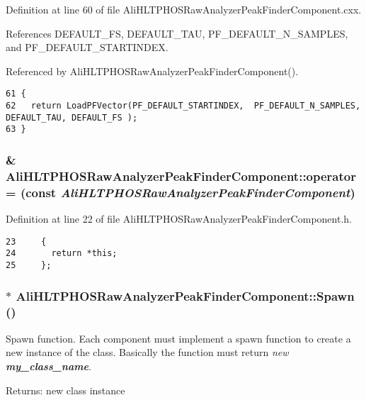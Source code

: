 Definition at line 60 of file Ali\-HLTPHOSRaw\-Analyzer\-Peak\-Finder\-Component.cxx.

References DEFAULT\_\-FS, DEFAULT\_\-TAU, PF\_\-DEFAULT\_\-N\_\-SAMPLES, and PF\_\-DEFAULT\_\-STARTINDEX.

Referenced by Ali\-HLTPHOSRaw\-Analyzer\-Peak\-Finder\-Component().

\footnotesize\begin{verbatim}61 {
62   return LoadPFVector(PF_DEFAULT_STARTINDEX,  PF_DEFAULT_N_SAMPLES, DEFAULT_TAU, DEFAULT_FS );
63 }
\end{verbatim}\normalsize 


\subsubsection{\& Ali\-HLTPHOSRaw\-Analyzer\-Peak\-Finder\-Component::operator= (const  {\em Ali\-HLTPHOSRaw\-Analyzer\-Peak\-Finder\-Component})\hspace{0.3cm}{\tt  [inline, private]}}\label{classAliHLTPHOSRawAnalyzerPeakFinderComponent_d3}




Definition at line 22 of file Ali\-HLTPHOSRaw\-Analyzer\-Peak\-Finder\-Component.h.

\footnotesize\begin{verbatim}23     {
24       return *this;
25     };
\end{verbatim}\normalsize 


\subsubsection{ $\ast$ Ali\-HLTPHOSRaw\-Analyzer\-Peak\-Finder\-Component::Spawn ()\hspace{0.3cm}{\tt  [virtual]}}\label{classAliHLTPHOSRawAnalyzerPeakFinderComponent_a3}


Spawn function. Each component must implement a spawn function to create a new instance of the class. Basically the function must return {\em new {\bf my\_\-class\_\-name}\/}. \begin{Desc}
\item[Returns:]new class instance \end{Desc}


